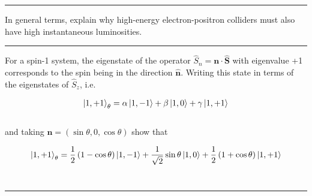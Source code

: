 \noindent\rule{7in}{1.5pt}


\begin{problem}{6.5}
    In general terms, explain why high-energy electron-positron colliders must also have high instantaneous luminosities.
\end{problem}
\begin{solution}

\end{solution}

\noindent\rule{7in}{1.5pt}


\begin{problem}{6.6}
    For a spin-1 system, the eigenstate of the operator $\hat{S}_n = \mathbf{n}\cdot\hat{\mathbf{S}}$ with eigenvalue +1 
    corresponds to the spin being in the direction $\hat{\mathbf{n}}$. Writing this state in terms of the eigenstates of $\hat{S}_z$, i.e.

    \begin{align*}
        \ket{1,+1}_\theta = \alpha \ket{1,-1} + \beta \ket{1,0} + \gamma \ket{1,+1}
    \end{align*}\\
    and taking $\mathbf{n} = \left(\sin\theta,0,\cos\theta\right)$ show that

    \begin{align*}
        \ket{1,+1}_\theta = \frac{1}{2}\left(1-\cos\theta\right)\ket{1,-1} + \frac{1}{\sqrt{2}} \sin\theta \ket{1,0} + \frac{1}{2}\left(1+\cos\theta\right) \ket{1,+1}
    \end{align*}\\

\end{problem}
\begin{solution}

\end{solution}

\noindent\rule{7in}{1.5pt}


